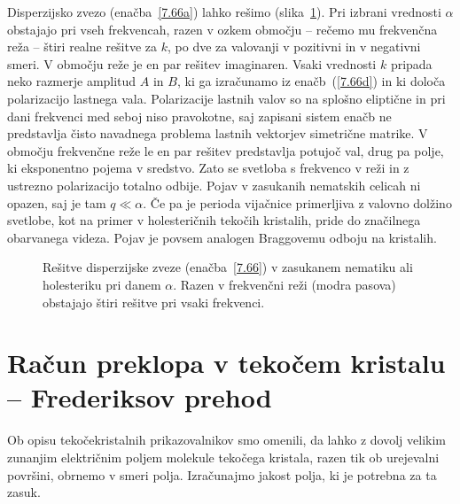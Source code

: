 \begin{remark}
Disperzijsko zvezo (enačba~\ref{7.66a}) 
lahko rešimo (slika~\ref{gap}). Pri izbrani vrednosti $\alpha$ 
obstajajo pri vseh frekvencah, razen v ozkem območju -- rečemo mu frekvenčna reža --
štiri realne rešitve za $k$, po dve za valovanji v pozitivni in v negativni smeri.
V območju reže je en par rešitev imaginaren. Vsaki vrednosti $k$
pripada neko razmerje amplitud $A$ in $B$, ki ga izračunamo
iz enačb~(\ref{7.66d}) in ki določa polarizacijo lastnega vala. Polarizacije
lastnih valov so na splošno eliptične in pri dani frekvenci med
seboj niso pravokotne, saj zapisani sistem enačb ne predstavlja čisto 
navadnega problema lastnih vektorjev simetrične matrike. 
V območju frekvenčne reže le en par rešitev predstavlja
potujoč val, drug pa polje, ki eksponentno pojema v sredstvo. Zato
se svetloba s frekvenco v reži in z ustrezno polarizacijo totalno odbije. Pojav v zasukanih
nematskih celicah ni opazen, saj je tam $q \ll \alpha$. Če pa je perioda vijačnice
primerljiva z valovno dolžino svetlobe, kot na primer v holesteričnih
tekočih kristalih, pride do značilnega obarvanega videza. Pojav
je povsem analogen Braggovemu odboju na kristalih.
\begin{figure}[ht]
\centering
\def\svgwidth{80truemm} 

\caption{Rešitve disperzijske zveze (enačba~\ref{7.66}) v zasukanem nematiku
ali holesteriku pri danem $\alpha$. Razen v frekvenčni reži (modra pasova) obstajajo štiri 
rešitve pri vsaki frekvenci.}
\label{gap}
\end{figure}
\end{remark}

\section{Račun preklopa v tekočem kristalu -- Frederiksov prehod}
Ob opisu tekočekristalnih prikazovalnikov smo omenili, da lahko z dovolj velikim 
zunanjim električnim poljem molekule tekočega kristala, razen tik ob urejevalni površini,
obrnemo v smeri polja. Izračunajmo jakost polja, ki je potrebna za ta zasuk. 

